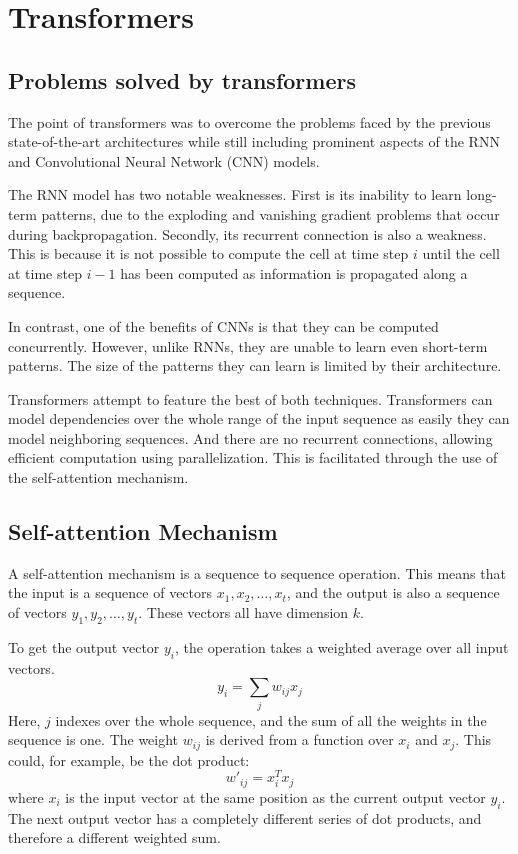 \section{Transformers}
\subsection{Problems solved by transformers}
The point of transformers was to overcome the problems faced by the previous state-of-the-art architectures while still including prominent aspects of the RNN and Convolutional Neural Network (CNN) models.

The RNN model has two notable weaknesses. First is its inability to learn long-term patterns, due to the exploding and vanishing gradient problems that occur during backpropagation.
Secondly, its recurrent connection is also a weakness. This is because it is not possible to compute the cell at time step $i$ until the cell at time step $i-1$ has been computed as information is propagated along a sequence.

In contrast, one of the benefits of CNNs is that they can be computed concurrently. However, unlike RNNs, they are unable to learn even short-term patterns. The size of the patterns they can learn is limited by their architecture.

Transformers attempt to feature the best of both techniques.
Transformers can model dependencies over the whole range of the input sequence as easily they can model neighboring sequences. And there are no recurrent connections, allowing efficient computation using parallelization. This is facilitated through the use of the self-attention mechanism.\cite{TransformersScratchPeterbloem}


\subsection{Self-attention Mechanism}
A self-attention mechanism is a sequence to sequence operation. This means that the input is a sequence of vectors $x_{1},x_{2},\ldots, x_{t}$, and the output is also a sequence of vectors $y_{1},y_{2},\ldots, y_{t}$.
These vectors all have dimension $k$.

To get the output vector $y_{i}$, the operation takes a weighted average over all input vectors.
$$
y_{i}=\sum_{j}w_{ij}x_{j}
$$
Here, $j$ indexes over the whole sequence, and the sum of all the weights in the sequence is one.
The weight $w_{ij}$ is derived from a function over $x_{i}$ and $x_{j}$.
This could, for example, be the dot product:
$$
w'_{ij}=x_{i}^Tx_{j}
$$
where $x_{i}$ is the input vector at the same position as the current output vector $y_{i}$.
The next output vector has a completely different series of dot products, and therefore a different weighted sum.

